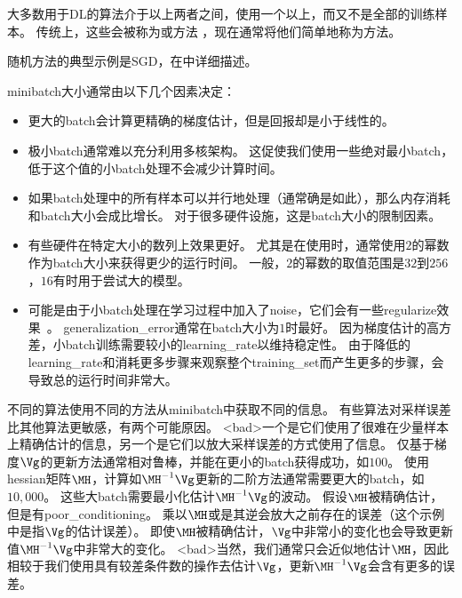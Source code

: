 大多数用于\gls{DL}的算法介于以上两者之间，使用一个以上，而又不是全部的训练样本。
传统上，这些会被称为或方法 ，现在通常将他们简单地称为方法。


随机方法的典型示例是\gls{SGD}，在中详细描述。

\gls{minibatch}大小通常由以下几个因素决定：
\begin{itemize}
    \item 更大的\gls{batch}会计算更精确的梯度估计，但是回报却是小于线性的。
    
    \item 极小\gls{batch}通常难以充分利用多核架构。
    这促使我们使用一些绝对最小\gls{batch}，低于这个值的小\gls{batch}处理不会减少计算时间。
    
    \item 如果\gls{batch}处理中的所有样本可以并行地处理（通常确是如此），那么内存消耗和\gls{batch}大小会成比增长。
    对于很多硬件设施，这是\gls{batch}大小的限制因素。
    
    \item 有些硬件在特定大小的数列上效果更好。
    尤其是在使用时，通常使用$2$的幂数作为\gls{batch}大小来获得更少的运行时间。
    一般，$2$的幂数的取值范围是$32$到$256$，$16$有时用于尝试大的模型。
    \item 
    可能是由于小\gls{batch}处理在学习过程中加入了\gls{noise}，它们会有一些\gls{regularize}效果~\citep{Wilson-2003}。
    \gls{generalization_error}通常在\gls{batch}大小为$1$时最好。
    因为梯度估计的高方差，小\gls{batch}训练需要较小的\gls{learning_rate}以维持稳定性。
    由于降低的\gls{learning_rate}和消耗更多步骤来观察整个\gls{training_set}而产生更多的步骤，会导致总的运行时间非常大。
\end{itemize}


不同的算法使用不同的方法从\gls{minibatch}中获取不同的信息。
有些算法对采样误差比其他算法更敏感，有两个可能原因。
<bad>一个是它们使用了很难在少量样本上精确估计的信息，另一个是它们以放大采样误差的方式使用了信息。
仅基于梯度$\Vg$的更新方法通常相对鲁棒，并能在更小的\gls{batch}获得成功，如$100$。
使用\gls{hessian}矩阵$\MH$，计算如$\MH^{-1}\Vg$更新的二阶方法通常需要更大的\gls{batch}，如$10,000$。
这些大\gls{batch}需要最小化估计$\MH^{-1}\Vg$的波动。
假设$\MH$被精确估计，但是有\gls{poor_conditioning}。
乘以$\MH$或是其逆会放大之前存在的误差（这个示例中是指$\Vg$的估计误差）。
即使$\MH$被精确估计，$\Vg$中非常小的变化也会导致更新值$\MH^{-1}\Vg$中非常大的变化。
<bad>当然，我们通常只会近似地估计$\MH$，因此相较于我们使用具有较差条件数的操作去估计$\Vg$，更新$\MH^{-1}\Vg$会含有更多的误差。

